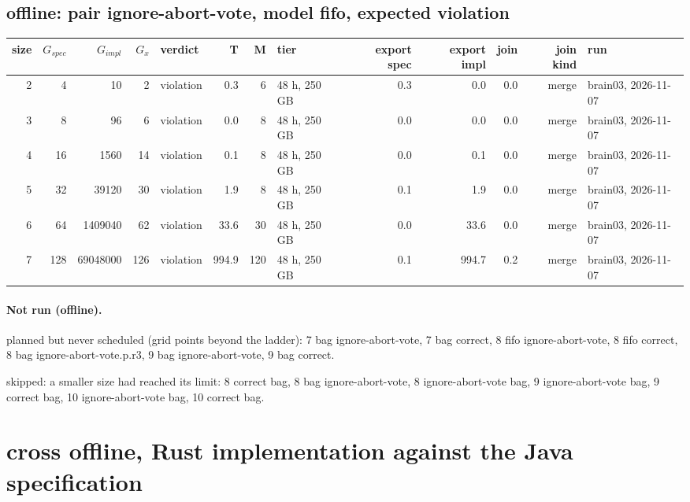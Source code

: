 \documentclass[10pt]{article}
\begin{document}
\subsection*{offline: pair \textsf{ignore-abort-vote}, model fifo, expected violation}
\begin{longtable}{@{}rrrrlrrlrrrrl@{}}
\toprule
size & $G_{\mathit{spec}}$ & $G_{\mathit{impl}}$ & $G_x$ & verdict & T & M & tier & export spec & export impl & join & join kind & run \\
\midrule
\endhead
\color{blue} 2 & 4 & 10 & 2 & violation & 0.3 & 6 & 48 h, 250 GB & 0.3 & 0.0 & 0.0 & merge & brain03, 2026-11-07 \\
\color{blue} 3 & 8 & 96 & 6 & violation & 0.0 & 8 & 48 h, 250 GB & 0.0 & 0.0 & 0.0 & merge & brain03, 2026-11-07 \\
\color{blue} 4 & 16 & 1560 & 14 & violation & 0.1 & 8 & 48 h, 250 GB & 0.0 & 0.1 & 0.0 & merge & brain03, 2026-11-07 \\
\color{blue} 5 & 32 & 39120 & 30 & violation & 1.9 & 8 & 48 h, 250 GB & 0.1 & 1.9 & 0.0 & merge & brain03, 2026-11-07 \\
\color{blue} 6 & 64 & 1409040 & 62 & violation & 33.6 & 30 & 48 h, 250 GB & 0.0 & 33.6 & 0.0 & merge & brain03, 2026-11-07 \\
\color{blue} 7 & 128 & 69048000 & 126 & violation & 994.9 & 120 & 48 h, 250 GB & 0.1 & 994.7 & 0.2 & merge & brain03, 2026-11-07 \\
\bottomrule
\end{longtable}
\paragraph{Not run (offline).}
planned but never scheduled (grid points beyond the ladder): 7 bag ignore-abort-vote, 7 bag correct, 8 fifo ignore-abort-vote, 8 fifo correct, 8 bag ignore-abort-vote.p.r3, 9 bag ignore-abort-vote, 9 bag correct.\par
skipped: a smaller size had reached its limit: 8 correct bag, 8 bag ignore-abort-vote, 8 ignore-abort-vote bag, 9 ignore-abort-vote bag, 9 correct bag, 10 ignore-abort-vote bag, 10 correct bag.\par
\section*{cross offline, Rust implementation against the Java specification}
\end{document}
